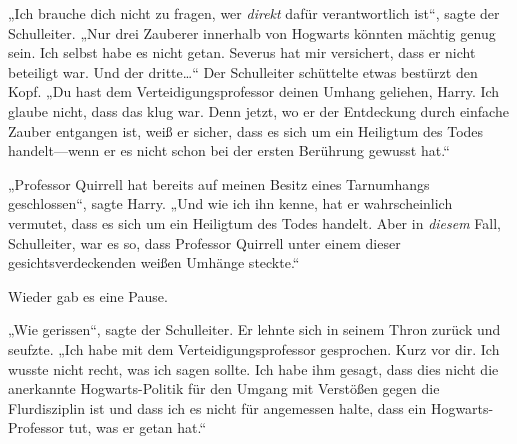 „Ich brauche dich nicht zu fragen, wer \emph{direkt} dafür verantwortlich ist“, sagte der Schulleiter. „Nur drei Zauberer innerhalb von Hogwarts könnten mächtig genug sein. Ich selbst habe es nicht getan. Severus hat mir versichert, dass er nicht beteiligt war. Und der dritte…“ Der Schulleiter schüttelte etwas bestürzt den Kopf. „Du hast dem Verteidigungsprofessor deinen Umhang geliehen, Harry. Ich glaube nicht, dass das klug war. Denn jetzt, wo er der Entdeckung durch einfache Zauber entgangen ist, weiß er sicher, dass es sich um ein Heiligtum des Todes handelt—wenn er es nicht schon bei der ersten Berührung gewusst hat.“

„Professor Quirrell hat bereits auf meinen Besitz eines Tarnumhangs geschlossen“, sagte Harry. „Und wie ich ihn kenne, hat er wahrscheinlich vermutet, dass es sich um ein Heiligtum des Todes handelt. Aber in \emph{diesem} Fall, Schulleiter, war es so, dass Professor Quirrell unter einem dieser gesichtsverdeckenden weißen Umhänge steckte.“

Wieder gab es eine Pause.

„Wie gerissen“, sagte der Schulleiter. Er lehnte sich in seinem Thron zurück und seufzte. „Ich habe mit dem Verteidigungsprofessor gesprochen. Kurz vor dir. Ich wusste nicht recht, was ich sagen sollte. Ich habe ihm gesagt, dass dies nicht die anerkannte Hogwarts-Politik für den Umgang mit Verstößen gegen die Flurdisziplin ist und dass ich es nicht für angemessen halte, dass ein Hogwarts-Professor tut, was er getan hat.“

